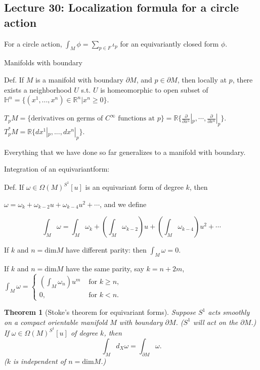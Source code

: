 \documentclass{article}
\theoremstyle{mystyle}
\newtheorem*{theorem*}{Theorem}
\theoremstyle{remark}
\numberwithin{equation}{section}
\begin{document}
\subsection{Lecture 30: Localization formula for a circle action}


For a circle action, $\int_M \phi = \sum_{p \in F}\iota_p$ for an equivariantly closed form $\phi$. 



Manifolds with boundary

Def. If $M$ is a manifold with boundary $\partial M$, and $p \in \partial M$, then locally at $p$, there exists a neighborhood $U$ s.t. $U$ is homeomorphic to open subset of $\mathbb{H}^n = \{(x^1,...,x^n) \in \mathbb{R}^n|x^n\geq 0\}$.  

$T_pM = \{\text{derivatives on germs of }C^\infty \text{ functions at }p\} = \mathbb{R}\{\frac{\partial}{\partial x^1}|_p,\cdots,\frac{\partial}{\partial x^n}|_p\}$.  $T^*_pM = \mathbb{R}\{dx^1|_p,..., dx^n|_p\}$. 

Everything that we have done so far generalizes to a manifold with boundary.

Integration of an equivariantform:

Def. If $\omega \in \Omega(M)^{S^1}[u]$ is an equivariant form of degree $k$, then 

$\omega = \omega_k+ \omega_{k-2} u + \omega_{k-4}u^2 + \cdots$, and we define

$$\int_M\omega = \int_M \omega_k + \left(\int_M \omega_{k-2}\right) u +  
\left(\int_M \omega_{k-4}\right) u^2+\cdots $$

If $k$ and $n = \mathrm{dim}M$ have different parity: then $\int_M\omega=0$.

If $k$ and $n = \mathrm{dim}M$ have the same parity, say $k = n+2m$, $\int_M\omega
=
\left\{\begin{array}{ll}
\left(\int_M\omega_n\right) u^m & \text{ for }k\geq n,\\
0, & \text{ for }k<n.
\end{array}\right.$



\begin{theorem*}[Stoke's theorem for equivariant forms]
Suppose $S^1$ acts smoothly on a compact orientable manifold $M$ with boundary $\partial M$. ($S^1$ will act on the $\partial M$.) If $\omega \in \Omega(M)^{S^1}[u]$ of degree $k$, then 
$$\int_M d_X\omega
= \int_{\partial M} \omega.$$
($k$ is independent of $n= \mathrm{dim} M$.)
\end{theorem*}
\end{document}
